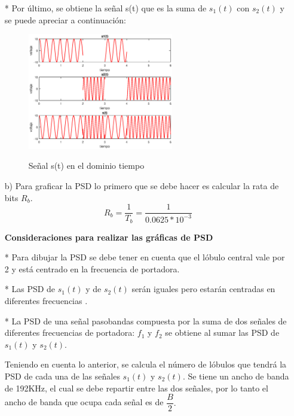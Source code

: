 \begin{itemize}
\item[*]Por \'ultimo, se obtiene la se\~nal s(t) que es la suma de $s_{1}(t)$ con $s_{2}(t)$ y se puede apreciar a continuaci\'on:

 \vspace{200px}
   \begin{figure}[h!]
	\captionsetup{justification = raggedright, singlelinecheck = false}
    \caption{Se\~nal s(t) en el dominio tiempo  }
    \centering
    \includegraphics[width=0.6\textwidth]{Imagenes/5.eps}
    \label{fig:ejerciciosenals}
\end{figure}

 
\item[b)]Para graficar la PSD lo primero que se debe hacer es calcular la rata de bits $R_{b}$.\\

\begin{equation} \label{capdos_treintasiete}
 R_{b}=\dfrac{1}{T_{b}}=\dfrac{1}{0.0625*10^{-3}}
\end{equation}

\textbf{Consideraciones para realizar las gráficas de PSD} 
\item[*] Para dibujar la PSD se debe tener en cuenta que el l\'obulo central vale por 2 y est\'a centrado en la frecuencia de portadora.
\item[*] Las PSD de $s_{1}(t)$ y de $s_{2}(t)$ ser\'an iguales pero estar\'an centradas en diferentes frecuencias .   
\item[*] La PSD de una se\~nal pasobandas compuesta por la suma de dos se\~nales de diferentes frecuencias de portadora: $f_{1}$ y $f_{2}$ se obtiene al sumar las PSD de $s_{1}(t)$ y $s_{2}(t)$. \

Teniendo en cuenta lo anterior, se calcula el n\'umero de l\'obulos que tendr\'a la PSD de cada una de las se\~nales $s_{1}(t)$ y $s_{2}(t)$. Se tiene un ancho de banda de 192KHz, el cual se debe repartir entre las dos se\~nales, por lo tanto el ancho de banda que ocupa cada se\~nal es de $ \dfrac{B}{2}.$


\end{itemize}
